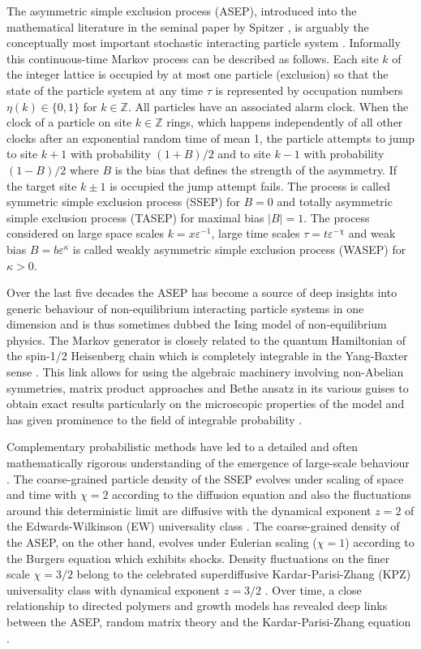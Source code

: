 \documentclass[12pt]{article}
\newcommand{\Z}{{\mathbb Z}}
\begin{document}
The asymmetric simple exclusion process (ASEP), introduced into the 
mathematical literature in the seminal paper by Spitzer \cite{Spit70}, 
is arguably the conceptually most important stochastic interacting 
particle system \cite{Derr98,Ligg99,Kipn99,Schu01}. Informally this 
continuous-time Markov process can be described as follows. Each site 
$k$ of the integer lattice is occupied by at most one particle (exclusion) 
so that the state of the particle system at any time $\tau$ is 
represented by occupation numbers $\eta(k)\in\{0,1\}$ for $k\in\Z$. 
All particles have an associated alarm clock. When the clock of a 
particle on site $k\in\Z$ rings, which happens independently of all other 
clocks after an exponential random time of mean 1, the particle 
attempts to jump to site $k+1$ with probability $(1+B)/2$ and to site 
$k-1$ with probability $(1-B)/2$ where $B$ is the bias that defines 
the strength of the asymmetry. If the target site $k\pm1$ is occupied 
the jump attempt fails. The process is called symmetric simple 
exclusion process (SSEP) for $B=0$ and totally asymmetric simple 
exclusion process (TASEP) for maximal bias $|B|=1$. The process 
considered on large space scales $k=x\varepsilon^{-1}$, large time 
scales $\tau=t\varepsilon^{-\chi}$ and weak bias $B=b 
\varepsilon^{\kappa}$ is called weakly asymmetric simple exclusion 
process (WASEP) for $\kappa >0$. 

Over the last five decades the ASEP has become a source of deep 
insights into generic behaviour of non-equilibrium interacting particle 
systems in one dimension and is thus sometimes dubbed the Ising 
model of non-equilibrium physics. The Markov generator is closely 
related to the quantum Hamiltonian of the spin-1/2 Heisenberg chain 
\cite{Alex78,Gwa92} which is completely integrable in the Yang-Baxter 
sense \cite{Baxt82,Gaud14}. This link allows for using the algebraic 
machinery involving non-Abelian symmetries, matrix product 
approaches and Bethe ansatz in its various guises to obtain exact 
results particularly on the microscopic properties of the model 
\cite{Derr98,Schu01} and has given prominence to the field of 
integrable probability \cite{Boro16}. 

Complementary probabilistic methods have led 
to a detailed and often mathematically rigorous understanding of the 
emergence of large-scale behaviour \cite{Spoh91,Ligg99,Kipn99,Bert15}. 
The coarse-grained particle density of the SSEP evolves under 
scaling of space and time with $\chi=2$ according to the diffusion 
equation and also the fluctuations around this deterministic limit are 
diffusive with the dynamical exponent $z=2$ of the Edwards-Wilkinson 
(EW) universality class \cite{Edwa82}. The coarse-grained density of 
the ASEP, on the other hand, evolves under Eulerian scaling 
($\chi=1$) according to the Burgers equation which exhibits shocks.
Density fluctuations on the finer scale $\chi=3/2$ belong to the 
celebrated superdiffusive Kardar-Parisi-Zhang (KPZ) universality class 
with dynamical exponent $z=3/2$ \cite{Kard86,Halp15}. Over time, a 
close relationship to directed polymers and growth models has 
revealed deep links between the ASEP, random matrix theory and the 
Kardar-Parisi-Zhang equation \cite{Krie10,Corw12,Spoh17,Mate21}. 
\end{document}
